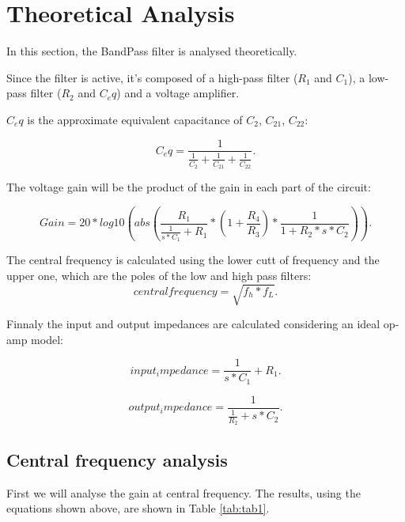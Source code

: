 \section{Theoretical Analysis}
\label{sec:analysis}

In this section, the BandPass filter is analysed theoretically.

Since the filter is active, it's composed of a high-pass filter ($R_1$
and $C_1$), a low-pass filter ($R_2$ and $C_eq$) and a voltage
amplifier.

$C_eq$ is the approximate equivalent capacitance of $C_2$, $C_21$, $C_22$:

\begin{equation}
  C_eq=\frac{1}{\frac{1}{C_2}+\frac{1}{C_21}+\frac{1}{C_22}}.
  \label{eq:n1}
\end{equation}

The voltage gain will be the product of the gain in each part of the circuit:

\begin{equation}
  Gain=20*log10(abs(\frac{R_1}{\frac{1}{s*C_1}+R_1}*(1+\frac{R_4}{R_3})*\frac{1}{1+R_2*s*C_2})).
  \label{eq:n2}
\end{equation}

The central frequency is calculated using the lower cutt of frequency
and the upper one, which are the poles of the low and high pass
filters:
\begin{equation}
  central frequency=\sqrt{f_h*f_L}.
  \label{eq:n3}
\end{equation}

Finnaly the input and output impedances are calculated considering an
ideal op-amp model:

\begin{equation}
  input_impedance=\frac{1}{s*C_1}+R_1.
  \label{eq:n4}
\end{equation}

\begin{equation}
  output_impedance=\frac{1}{\frac{1}{R_2}+s*C_2}.
  \label{eq:n5}
\end{equation}

\subsection{Central frequency analysis}

First we will analyse the gain at central frequency.  
The results, using the equations shown above, are shown in Table  \ref{tab:tab1}.

